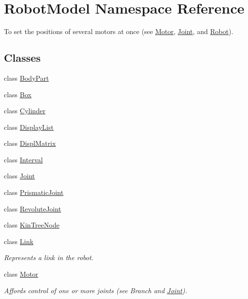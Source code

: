 \hypertarget{namespace_robot_model}{
\section{RobotModel Namespace Reference}
\label{namespace_robot_model}
}


To set the positions of several motors at once (see \hyperlink{class_robot_model_1_1_motor}{Motor}, \hyperlink{class_robot_model_1_1_joint}{Joint}, and \hyperlink{class_robot_model_1_1_robot}{Robot}).  
\subsection*{Classes}
\begin{DoxyCompactItemize}
\item 
class \hyperlink{class_robot_model_1_1_body_part}{BodyPart}
\item 
class \hyperlink{class_robot_model_1_1_box}{Box}
\item 
class \hyperlink{class_robot_model_1_1_cylinder}{Cylinder}
\item 
class \hyperlink{class_robot_model_1_1_display_list}{DisplayList}
\item 
class \hyperlink{class_robot_model_1_1_displ_matrix}{DisplMatrix}
\item 
class \hyperlink{class_robot_model_1_1_interval}{Interval}
\item 
class \hyperlink{class_robot_model_1_1_joint}{Joint}
\item 
class \hyperlink{class_robot_model_1_1_prismatic_joint}{PrismaticJoint}
\item 
class \hyperlink{class_robot_model_1_1_revolute_joint}{RevoluteJoint}
\item 
class \hyperlink{class_robot_model_1_1_kin_tree_node}{KinTreeNode}
\item 
class \hyperlink{class_robot_model_1_1_link}{Link}
\begin{DoxyCompactList}\small\item\em Represents a link in the robot. \item\end{DoxyCompactList}\item 
class \hyperlink{class_robot_model_1_1_motor}{Motor}
\begin{DoxyCompactList}\small\item\em Affords control of one or more joints (see Branch and \hyperlink{class_robot_model_1_1_joint}{Joint}). \item\end{DoxyCompactList}\item 

\end{DoxyCompactItemize}
